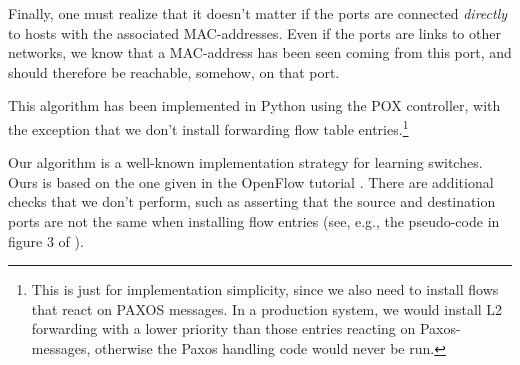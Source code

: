 Finally, one must realize that it doesn't matter if the ports are connected
\textit{directly} to hosts with the associated MAC-addresses.  Even if the
ports are links to other networks, we know that a MAC-address has been seen
coming from this port, and should therefore be reachable, somehow, on that
port.

This algorithm has been implemented in Python using the POX controller, with
the exception that we don't install forwarding flow table
entries.\footnote{This is just for implementation simplicity, since we also
need to install flows that react on PAXOS messages.  In a production
system, we would install L2 forwarding with a lower priority than those
entries reacting on Paxos-messages, otherwise the Paxos handling code would
never be run.}

Our algorithm is a well-known implementation strategy for learning
switches.  Ours is based on the one given in the OpenFlow
tutorial \cite{github:pox.tutorial}.
There are additional checks that we don't perform, such as
asserting that the source and destination ports are not the same when
installing flow entries (see, e.g., the pseudo-code in figure 3 of
\cite{Canini:2012:NWT:2228298.2228312}).
